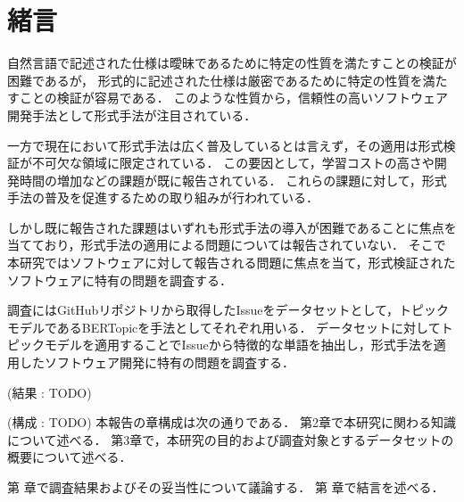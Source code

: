 \documentclass[main]{subfiles}
\begin{document}
\chapter{緒言}




自然言語で記述された仕様は曖昧であるために特定の性質を満たすことの検証が困難であるが，
形式的に記述された仕様は厳密であるために特定の性質を満たすことの検証が容易である．
このような性質から，信頼性の高いソフトウェア開発手法として形式手法が注目されている\cite{aoki:2018}．

一方で現在において形式手法は広く普及しているとは言えず，その適用は形式検証が不可欠な領域に限定されている．
この要因として，学習コストの高さや開発時間の増加などの課題が既に報告されている\cite{reid:2020}．
これらの課題に対して，形式手法の普及を促進するための取り組みが行われている\cite{huisman:2020,ohnishi:2020}．

しかし既に報告された課題はいずれも形式手法の導入が困難であることに焦点を当てており，形式手法の適用による問題については報告されていない．
そこで本研究ではソフトウェアに対して報告される問題に焦点を当て，形式検証されたソフトウェアに特有の問題を調査する．

調査にはGitHubリポジトリから取得したIssueをデータセットとして，トピックモデルであるBERTopic\cite{grootendorst:2022}を手法としてそれぞれ用いる．
データセットに対してトピックモデルを適用することでIssueから特徴的な単語を抽出し，形式手法を適用したソフトウェア開発に特有の問題を調査する．

(結果 : TODO)

(構成 : TODO)
本報告の章構成は次の通りである．
第2章で本研究に関わる知識について述べる．
第3章で，本研究の目的および調査対象とするデータセットの概要について述べる．

第 章で調査結果およびその妥当性について議論する．
第 章で結言を述べる．
\end{document}
